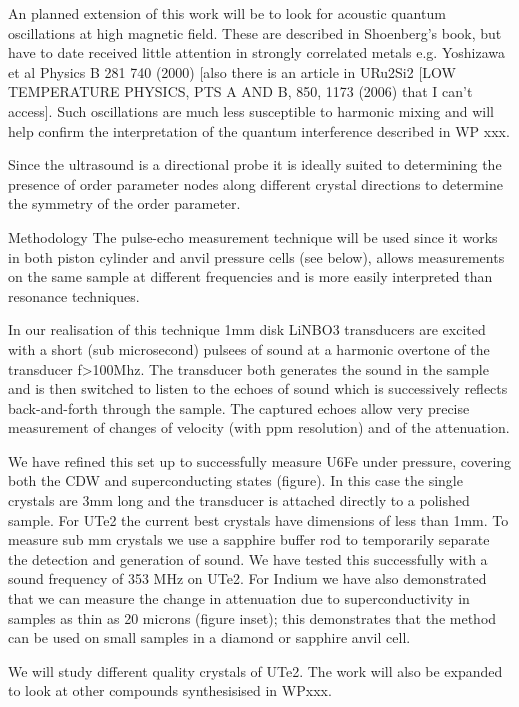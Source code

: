 An planned extension of this work will be to look for acoustic quantum oscillations at high magnetic field.  These are described in Shoenberg’s book, but have to date received little attention in strongly correlated metals e.g. Yoshizawa et al Physics B 281 740 (2000) [also there is an article in URu2Si2 [LOW TEMPERATURE PHYSICS, PTS A AND B, 850, 1173 (2006) that I can’t access]. Such oscillations are much less susceptible to harmonic mixing and will help confirm the interpretation of the quantum interference described in WP xxx.

Since the ultrasound is a directional probe it is ideally suited to determining the presence of order parameter nodes along different crystal directions to determine the symmetry of the order parameter.

Methodology
The pulse-echo measurement technique will be used since it works in both piston cylinder and anvil pressure cells (see below), allows measurements on the same sample at different frequencies and is more easily interpreted than resonance techniques.

In our realisation of this technique 1mm disk LiNBO3 transducers are excited with a short (sub microsecond) pulsees of sound at a harmonic overtone of the transducer f>100Mhz. The transducer both generates the sound in the sample and is then switched to listen to the echoes of sound which is successively reflects back-and-forth through the sample. The captured echoes allow very precise measurement of changes of velocity (with ppm resolution) and of the attenuation.

We have refined this set up to successfully measure U6Fe under pressure, covering both the CDW and superconducting states (figure). In this case the single crystals are 3mm long and the transducer is attached directly to a polished sample. For UTe2 the current best crystals have dimensions of less than 1mm. To measure sub mm crystals we use a sapphire buffer rod to temporarily separate the detection and generation of sound. We have tested this successfully with a sound frequency of 353 MHz on UTe2. For Indium we have also demonstrated that we can measure the change in attenuation due to superconductivity in samples as thin as 20 microns (figure inset); this demonstrates that the method can be used on small samples in a diamond or sapphire anvil cell.

We will study different quality crystals of UTe2.  The work will also be expanded to look at other compounds synthesisised in WPxxx. 

